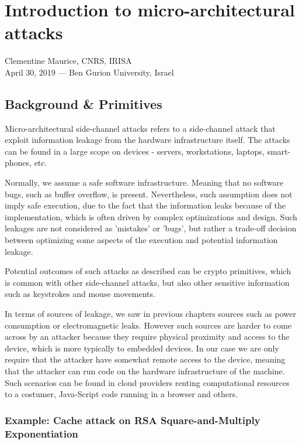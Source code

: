 \chapter{Introduction to micro-architectural attacks}
\label{chap:c7_cacheattacks}

Clementine Maurice, CNRS, IRISA\\
April 30, 2019 — Ben Gurion University, Israel

\section{Background \& Primitives} %
\label{sec:BackgroundnPrimitives}

Micro-architectural side-channel attacks refers to a side-channel attack that
exploit information leakage from the hardware infrastructure itself. The attacks
can be found in a large scope on devices - servers, workstations, laptops,
smart-phones, etc.

Normally, we assume a safe software infrastructure. Meaning that no software
bugs, such as buffer overflow, is present. Nevertheless, such assumption does
not imply safe execution, due to the fact that the information leaks because of
the implementation, which is often driven by complex optimizations and design.
Such leakages are not considered as 'mistakes' or 'bugs', but rather a trade-off
decision between optimizing some aspects of the execution and potential
information leakage.    

Potential outcomes of such attacks as described can be crypto primitives, which
is common with other side-channel attacks, but also other sensitive information
such as keystrokes and mouse movements.  

In terms of sources of leakage, we saw in previous chapters sources such as
power consumption or electromagnetic leaks. However such sources are harder to
come across by an attacker because they require physical proximity and access to
the device, which is more typically to embedded devices. In our case we are only
require that the attacker have somewhat remote access to the device, meaning
that the attacker can run code on the hardware infrastructure of the machine.
Such scenarios can be found in cloud providers renting computational resources
to a costumer, Java-Script code running in a browser and others.

\subsection{Example: Cache attack on RSA Square-and-Multiply Exponentiation}
\label{subsec:CacheattackonRSA}

